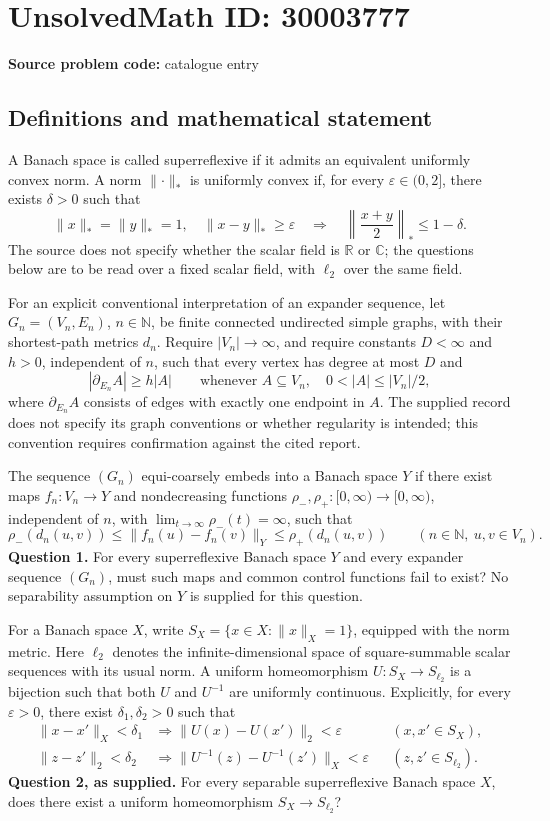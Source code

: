 \documentclass[11pt]{article}
\newcommand{\N}{\mathbb{N}}
\newcommand{\R}{\mathbb{R}}
\newcommand{\C}{\mathbb{C}}
\begin{document}
\section*{UnsolvedMath ID: 30003777}
\textbf{Source problem code:} catalogue entry
\subsection{Definitions and mathematical statement}
A Banach space is called superreflexive if it admits an equivalent uniformly convex norm. A norm \(\lVert\cdot\rVert_*\) is uniformly convex if, for every \(\varepsilon\in(0,2]\), there exists \(\delta>0\) such that
\[
\lVert x\rVert_*=\lVert y\rVert_*=1,\quad \lVert x-y\rVert_*\geq\varepsilon
\quad\Longrightarrow\quad
\left\lVert\frac{x+y}{2}\right\rVert_*\leq1-\delta.
\]
The source does not specify whether the scalar field is \(\R\) or \(\C\); the questions below are to be read over a fixed scalar field, with \(\ell_2\) over the same field.

For an explicit conventional interpretation of an expander sequence, let \(G_n=(V_n,E_n)\), \(n\in\N\), be finite connected undirected simple graphs, with their shortest-path metrics \(d_n\). Require \(|V_n|\to\infty\), and require constants \(D<\infty\) and \(h>0\), independent of \(n\), such that every vertex has degree at most \(D\) and
\[
|\partial_{E_n}A|\geq h|A|
\qquad\text{whenever }A\subseteq V_n,\quad 0<|A|\leq |V_n|/2,
\]
where \(\partial_{E_n}A\) consists of edges with exactly one endpoint in \(A\). The supplied record does not specify its graph conventions or whether regularity is intended; this convention requires confirmation against the cited report.

The sequence \((G_n)\) equi-coarsely embeds into a Banach space \(Y\) if there exist maps \(f_n:V_n\to Y\) and nondecreasing functions \(\rho_-,\rho_+:[0,\infty)\to[0,\infty)\), independent of \(n\), with \(\lim_{t\to\infty}\rho_-(t)=\infty\), such that
\[
\rho_-(d_n(u,v))\leq\lVert f_n(u)-f_n(v)\rVert_Y
\leq\rho_+(d_n(u,v))
\qquad(n\in\N,\ u,v\in V_n).
\]
\textbf{Question 1.} For every superreflexive Banach space \(Y\) and every expander sequence \((G_n)\), must such maps and common control functions fail to exist? No separability assumption on \(Y\) is supplied for this question.

For a Banach space \(X\), write \(S_X=\{x\in X:\lVert x\rVert_X=1\}\), equipped with the norm metric. Here \(\ell_2\) denotes the infinite-dimensional space of square-summable scalar sequences with its usual norm. A uniform homeomorphism \(U:S_X\to S_{\ell_2}\) is a bijection such that both \(U\) and \(U^{-1}\) are uniformly continuous. Explicitly, for every \(\varepsilon>0\), there exist \(\delta_1,\delta_2>0\) such that
\[
\begin{aligned}
\lVert x-x'\rVert_X<\delta_1&\Longrightarrow
\lVert U(x)-U(x')\rVert_2<\varepsilon
&& (x,x'\in S_X),\\
\lVert z-z'\rVert_2<\delta_2&\Longrightarrow
\lVert U^{-1}(z)-U^{-1}(z')\rVert_X<\varepsilon
&& (z,z'\in S_{\ell_2}).
\end{aligned}
\]
\textbf{Question 2, as supplied.} For every separable superreflexive Banach space \(X\), does there exist a uniform homeomorphism \(S_X\to S_{\ell_2}\)?
\end{document}
